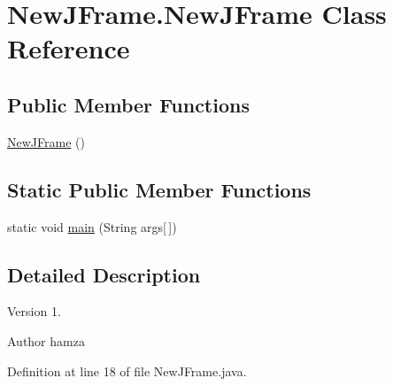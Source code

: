 \hypertarget{class_new_j_frame_1_1_new_j_frame}{\section{\-New\-J\-Frame.\-New\-J\-Frame \-Class \-Reference}
\label{class_new_j_frame_1_1_new_j_frame}
}
\subsection*{\-Public \-Member \-Functions}
\begin{DoxyCompactItemize}
\item 
\hyperlink{class_new_j_frame_1_1_new_j_frame_ae8a7c9824a227fa34e3e33e93944b2e4}{\-New\-J\-Frame} ()
\end{DoxyCompactItemize}
\subsection*{\-Static \-Public \-Member \-Functions}
\begin{DoxyCompactItemize}
\item 
static void \hyperlink{class_new_j_frame_1_1_new_j_frame_a8b67a6f4abb957f015d5c9ab4669aceb}{main} (\-String args\mbox{[}$\,$\mbox{]})
\end{DoxyCompactItemize}


\subsection{\-Detailed \-Description}
\begin{DoxyVersion}{\-Version}
1. 
\end{DoxyVersion}
\begin{DoxyAuthor}{\-Author}
hamza 
\end{DoxyAuthor}


\-Definition at line 18 of file \-New\-J\-Frame.\-java.



